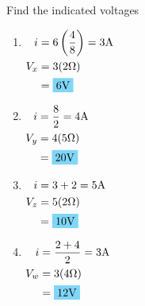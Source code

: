 Find the indicated voltages
\begin{enumerate}[leftmargin=2cm,labelsep=.5cm,label=\bfseries\alph*)]
	\item $
	\begin{aligned}[t]
	i&=6\left( \frac{4}{8}\right) = 3\qw{\A} \\
	V_x &= 3(2\qw{\ohm}) \\
	&= \hlbox{6\qw{\V}}
	\end{aligned} $
	\\[1cm]
	
	\item $
	\begin{aligned}[t]
	i&= \frac{8}{2} = 4\qw{\A} \\
	V_y &= 4(5\qw{\ohm}) \\
	&= \hlbox{20\qw{\V}}
	\end{aligned} $
	\\[1cm]
	
	\item $
	\begin{aligned}[t]
	i&=3+2 = 5\qw{\A} \\
	V_z &= 5(2\qw{\ohm}) \\
	&= \hlbox{10\qw{\V}}
	\end{aligned} $
	\\[1cm]
	
	\item $
	\begin{aligned}[t]
	i&=\frac{2+4}{2} = 3\qw{\A} \\
	V_w &= 3(4\qw{\ohm}) \\
	&= \hlbox{12\qw{\V}}
	\end{aligned} $
	\\[1cm]
\end{enumerate}